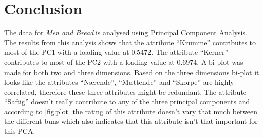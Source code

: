 \section*{Conclusion}
%
The data for \textit{Men and Bread} is analysed using Principal Component Analysis. The results from this analysis shows that the attribute ``Krumme'' contributes to most of the PC1 with a loading value at 0.5472. The attribute ``Kerner'' contributes to most of the PC2 with a loading value at 0.6974. \blankline
%
A bi-plot was made for both two and three dimensions. Based on the three dimensions bi-plot it looks like the attributes ``Nærende'', ``Mættende'' and ``Skorpe'' are highly correlated, therefore these three attributes might be redundant. \blankline
%
The attribute ``Saftig'' doesn't really contribute to any of the three principal components and according to \autoref{fig:plot} the rating of this attribute doesn't vary that much between the different buns which also indicates that this attribute isn't that important for this PCA.